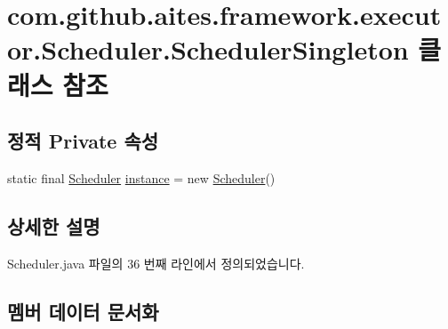 \hypertarget{classcom_1_1github_1_1aites_1_1framework_1_1executor_1_1_scheduler_1_1_scheduler_singleton}{}\section{com.\+github.\+aites.\+framework.\+executor.\+Scheduler.\+Scheduler\+Singleton 클래스 참조}
\label{classcom_1_1github_1_1aites_1_1framework_1_1executor_1_1_scheduler_1_1_scheduler_singleton}
\subsection*{정적 Private 속성}
\begin{DoxyCompactItemize}
\item 
static final \mbox{\hyperlink{classcom_1_1github_1_1aites_1_1framework_1_1executor_1_1_scheduler}{Scheduler}} \mbox{\hyperlink{classcom_1_1github_1_1aites_1_1framework_1_1executor_1_1_scheduler_1_1_scheduler_singleton_a96bb89062af3cf002b260ce213578a03}{instance}} = new \mbox{\hyperlink{classcom_1_1github_1_1aites_1_1framework_1_1executor_1_1_scheduler}{Scheduler}}()
\end{DoxyCompactItemize}


\subsection{상세한 설명}


Scheduler.\+java 파일의 36 번째 라인에서 정의되었습니다.



\subsection{멤버 데이터 문서화}
\mbox{\label{classcom_1_1github_1_1aites_1_1framework_1_1executor_1_1_scheduler_1_1_scheduler_singleton_a96bb89062af3cf002b260ce213578a03}} 
